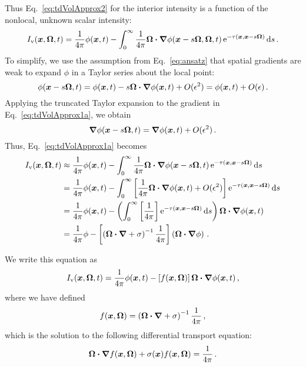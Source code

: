 Thus Eq.~\eqref{eq:tdVolApprox2} for the interior intensity is a function of the
nonlocal, unknown scalar intensity:
\begin{equation}\label{eq:tdVolApprox1a}
  I_\mathrm{v}(\bm{x},\bm{\Omega},t) = \frac{1}{4\pi} \phi(\bm{x},t) - 
     \int_{0}^{\infty}
    \frac{1}{4\pi} \bm{\Omega}\bm{\cdot} \bm{\nabla} \phi(\bm{x} - s \bm{\Omega}, \bm{\Omega}, t)
    \mathop{}\!\mathrm{e}^{ -\tau(\bm{x}, \bm{x} - s \bm{\Omega})}
    \mathop{}\!\mathrm{d} s \,.
\end{equation}
To simplify, we use the assumption from Eq.~\eqref{eq:ansatz} that spatial
gradients are weak to expand $\phi$ in a Taylor series about the local
point:
\begin{equation} \label{eq:taylorPhi}
  \phi(\bm{x} - s \bm{\Omega}, t)
  = \phi(\bm{x},t) - s\bm{\Omega} \bm{\cdot}
  \bm{\nabla}\phi (\bm{x}, t) + O(\epsilon^2) = \phi(\bm{x},t) +
  O(\epsilon) \,.
\end{equation}
Applying the truncated Taylor expansion to the gradient in
Eq.~\eqref{eq:tdVolApprox1a}, we obtain
\begin{equation*}
  \bm{\nabla} \phi(\bm{x}-s\bm{\Omega},t)
  = \bm{\nabla} \phi(\bm{x},t) + O(\epsilon^2)\,.
\end{equation*}
Thus, Eq.~\eqref{eq:tdVolApprox1a} becomes
\begin{align*}\nonumber
  I_\mathrm{v}(\bm{x},\bm{\Omega},t) &\approx \frac{1}{4\pi} \phi(\bm{x},t) - 
     \int_{0}^{\infty}
    \frac{1}{4\pi} \bm{\Omega}\bm{\cdot} \bm{\nabla} \phi(\bm{x} - s \bm{\Omega}, t)
    \mathop{}\!\mathrm{e}^{ -\tau(\bm{x}, \bm{x} - s \bm{\Omega})}
    \mathop{}\!\mathrm{d} s
\\
  &= \frac{1}{4\pi} \phi(\bm{x},t) - \int_{0}^{\infty}
    \left[ \frac1{4\pi}\bm{\Omega}\bm{\cdot} \bm{\nabla} \phi(\bm{x},t) + O(\epsilon^2) \right]
    \mathop{}\!\mathrm{e}^{ -\tau(\bm{x}, \bm{x} - s \bm{\Omega})}
    \mathop{}\!\mathrm{d} s
  \\ \nonumber
  &= \frac{1}{4\pi} \phi (\bm{x},t) - \left( \int_{0}^{\infty}
    \left[ \frac1{4\pi}\right]
    \mathop{}\!\mathrm{e}^{ -\tau(\bm{x}, \bm{x} - s \bm{\Omega})} \mathop{}\!\mathrm{d} s \right)
    \bm{\Omega}\bm{\cdot} \bm{\nabla} \phi(\bm{x},t)
  \\
  &= \frac{1}{4\pi} \phi - 
  \left[\left(\bm{\Omega}\bm{\cdot} \bm{\nabla}  + \sigma \right)^{-1}
   \frac{1}{4\pi}\right] \left( \bm{\Omega}\bm{\cdot} \bm{\nabla} \phi \right) \,.
\end{align*}

We write this equation as
\begin{equation}\label{eq:tdVolApprox2}
  I_\mathrm{v}(\bm{x},\bm{\Omega},t)
  = \frac{1}{4\pi} \phi (\bm{x},t)
  - \left[ f(\bm{x}, \bm{\Omega}) \right] \bm{\Omega}\bm{\cdot} \bm{\nabla} \phi(\bm{x},t)\,,
\end{equation}
where we have defined
\begin{equation*}
  f(\bm{x},\bm{\Omega}) = \left(\bm{\Omega}\bm{\cdot} \bm{\nabla}  + \sigma \right)^{-1}
  \frac{1}{4\pi} \,,
\end{equation*}
which is the solution to the following differential transport equation:
\begin{equation} \label{eq:fVol}
  \bm{\Omega}\bm{\cdot} \bm{\nabla} f(\bm{x}, \bm{\Omega})
  + \sigma(\bm{x}) f (\bm{x}, \bm{\Omega})
= \frac{1}{4\pi} \,.
\end{equation}

